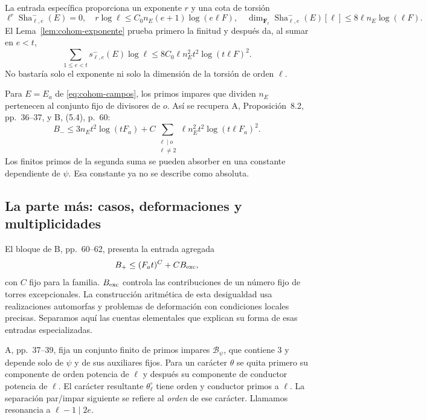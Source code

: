 La entrada específica proporciona un exponente $r$ y
una cota de torsión
\[
 \ell^r\operatorname{Sha}_{\ell,e}^{-}(E)=0,\quad
 r\log\ell\le C_0 n_E(e+1)\log(e\ell F),\quad
 \dim_{\mathbf F_\ell}
     \operatorname{Sha}_{\ell,e}^{-}(E)[\ell]
 \le8\ell n_E\log(\ell F).
\]
El Lema~\ref{lem:cohom-exponente} prueba primero la finitud
y después da, al sumar en $e<t$,
\[
 \sum_{1\le e<t}s_{\ell,e}^{-}(E)\log\ell
 \le8C_0\ell n_E^2t^2\log(t\ell F)^2.
\]
No bastaría solo el exponente ni solo la dimensión de
la torsión de orden $\ell$.

Para $E=E_a$ de \eqref{eq:cohom-campos}, los primos impares
que dividen $n_E$ pertenecen al conjunto fijo de divisores
de $o$. Así se recupera A, Proposición~8.2, pp.~36--37,
y B, (5.4), p.~60:
\begin{equation}
 B_-\le3n_Et^2\log(tF_a)
   +C\sum_{\substack{\ell\mid o\\\ell\ne2}}
       \ell n_E^2t^2\log(t\ell F_a)^2.
 \label{eq:cohom-menos-total}
\end{equation}
Los finitos primos de la segunda suma se pueden absorber
en una constante dependiente de $\psi$.
Esa constante ya no se describe como absoluta.

\subsection{La parte más: casos, deformaciones y multiplicidades}

El bloque de B, pp.~60--62, presenta la entrada agregada
\begin{equation}
 B_+\le(F_at)^C+C B_{\rm exc},
 \label{eq:cohom-mas-total}
\end{equation}
con $C$ fijo para la familia.
$B_{\rm exc}$ controla las contribuciones de un número
fijo de torres excepcionales.
La construcción aritmética de esta desigualdad usa
realizaciones automorfas y problemas de deformación
con condiciones locales precisas.
Separamos aquí las cuentas elementales que explican su
forma de esas entradas especializadas.

A, pp.~37--39, fija un conjunto finito de primos impares
$\mathcal B_\psi$, que contiene $3$ y depende solo de
$\psi$ y de sus auxiliares fijos.
Para un carácter $\theta$ se quita primero su componente
de orden potencia de $\ell$ y después su componente de
conductor potencia de $\ell$.
El carácter resultante $\theta_\ell^\circ$ tiene orden
y conductor primos a $\ell$.
La separación par/impar siguiente se refiere al
\emph{orden} de ese carácter.
Llamamos resonancia a $\ell-1\mid2e$.


